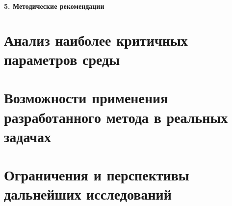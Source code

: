 \newpage
\begin{center}
  \textbf{\large 5. Методические рекомендации}
\end{center}

\section{Анализ наиболее критичных параметров среды}
\section{Возможности применения разработанного метода в реальных задачах}
\section{Ограничения и перспективы дальнейших исследований}
